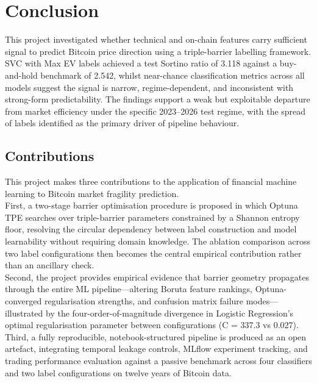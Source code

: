 
\section{Conclusion}
\label{sec:Conclusion}
This project investigated whether technical and on-chain features carry sufficient signal to predict Bitcoin price direction using a triple-barrier labelling framework. SVC with Max EV labels achieved a test Sortino ratio of 3.118 against a buy-and-hold benchmark of 2.542, whilst near-chance classification metrics across all models suggest the signal is narrow, regime-dependent, and inconsistent with strong-form predictability. The findings support a weak but exploitable departure from market efficiency under the specific 2023--2026 test regime, with the spread of labels identified as the primary driver of pipeline behaviour.

\subsection{Contributions}
This project makes three contributions to the application of financial machine learning to Bitcoin market fragility prediction.\\
First, a two-stage barrier optimisation procedure is proposed in which Optuna TPE searches over triple-barrier parameters constrained by a Shannon entropy floor, resolving the circular dependency between label construction and model learnability without requiring domain knowledge. The ablation comparison across two label configurations then becomes the central empirical contribution rather than an ancillary check.\\
Second, the project provides empirical evidence that barrier geometry propagates through the entire ML pipeline—altering Boruta feature rankings, Optuna-converged regularisation strengths, and confusion matrix failure modes—illustrated by the four-order-of-magnitude divergence in Logistic Regression's optimal regularisation parameter between configurations (C = 337.3 vs 0.027).\\
Third, a fully reproducible, notebook-structured pipeline is produced as an open artefact, integrating temporal leakage controls, MLflow experiment tracking, and trading performance evaluation against a passive benchmark across four classifiers and two label configurations on twelve years of Bitcoin data.

